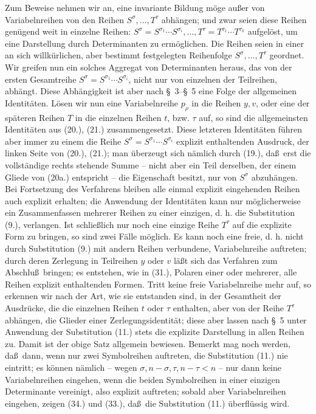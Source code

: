 Zum Beweise nehmen wir an, eine invariante Bildung m\"oge au\ss er von Variabelnreihen von den Reihen $S^\sigma,\ldots,T^\tau$ abh\"angen; und zwar seien diese Reihen gen\"ugend weit in einzelne Reihen: $S^\sigma=S^{\sigma_1}\cdots S^{\sigma_i},\ldots,T^\tau=T^{\tau_1}\cdots T^{\tau_k}$ aufgel\"ost, um eine Darstellung durch Determinanten zu erm\"oglichen. Die Reihen seien in einer an sich willk\"urlichen, aber bestimmt festgelegten Reihenfolge $S^\sigma,\ldots,T^\tau$ geordnet. Wir greifen nun ein solches Aggregat von Determinanten heraus, das von der ersten Gesamtreihe $S^\sigma=S^{\sigma_1}\cdots S^{\sigma_i}$, nicht nur von einzelnen der Teilreihen, abh\"angt. Diese Abh\"angigkeit ist aber nach \S\ 3--\S\ 5 eine Folge der allgemeinen Identit\"aten. L\"osen wir nun eine Variabelnreihe $p_\rho$ in die Reihen $y,v$, oder eine der sp\"ateren Reihen $T$ in die einzelnen Reihen $t$, bzw. $\tau$ auf, so sind die allgemeinsten Identit\"aten aus (20.), (21.) zusammengesetzt. Diese letzteren Identit\"aten f\"uhren aber immer zu einem die Reihe $S^\sigma=S^{\sigma_1}\cdots S^{\sigma_i}$ explizit enthaltenden Ausdruck, der linken Seite von (20.), (21.); man \"uberzeugt sich n\"amlich durch (19.), da\ss\ erst die vollst\"andige rechts stehende Summe -- nicht aber ein Teil derselben, der einem Gliede von (20a.) entspricht -- die Eigenschaft besitzt, nur von $S^\sigma$ abzuh\"angen. Bei Fortsetzung des Verfahrens bleiben alle einmal explizit eingehenden Reihen auch explizit erhalten; die Anwendung der Identit\"aten kann nur m\"oglicherweise ein Zusammenfassen mehrerer Reihen zu einer einzigen, d. h. die Substitution (9.), verlangen. Ist schlie\ss lich nur noch eine einzige Reihe $T^\tau$ auf die explizite Form zu bringen, so sind zwei F\"alle m\"oglich. Es kann noch eine freie, d. h. nicht durch Substitution (9.) mit andern Reihen verbundene, Variabelnreihe auftreten; durch deren Zerlegung in Teilreihen $y$ oder $v$ l\"a\ss t sich das Verfahren zum Abschlu\ss\ bringen; es entstehen, wie in (31.), Polaren einer oder mehrerer, alle Reihen explizit enthaltenden Formen. Tritt keine freie Variabelnreihe mehr auf, so erkennen wir nach der Art, wie sie entstanden sind, in der Gesamtheit der Ausdr\"ucke, die die einzelnen Reihen $t$ oder $\tau$ enthalten, aber von der Reihe $T^\tau$ abh\"angen, die Glieder einer Zerlegungsidentit\"at; diese aber lassen nach \S\ 5 unter Anwendung der Substitution (11.) stets die explizite Darstellung in allen Reihen zu. Damit ist der obige Satz allgemein bewiesen. Bemerkt mag noch werden, da\ss\ dann, wenn nur zwei Symbolreihen auftreten, die Substitution (11.) nie eintritt; es k\"onnen n\"amlich -- wegen $\sigma,n-\sigma,\tau,n-\tau<n$ -- nur dann keine Variabelnreihen eingehen, wenn die beiden Symbolreihen in einer einzigen Determinante vereinigt, also explizit auftreten; sobald aber Variabelnreihen eingehen, zeigen (34.) und (33.), da\ss\ die Substitution (11.) \"uberfl\"ussig wird.

